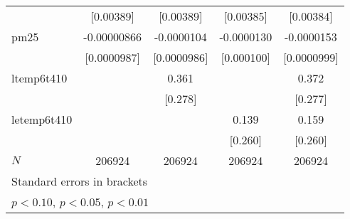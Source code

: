 {\begin{tabular}{l*{4}{c}}
            &   [0.00389]         &   [0.00389]         &   [0.00385]         &   [0.00384]         \\
[1em]
pm25        & -0.00000866         &  -0.0000104         &  -0.0000130         &  -0.0000153         \\
            & [0.0000987]         & [0.0000986]         &  [0.000100]         & [0.0000999]         \\
[1em]
ltemp6t410  &                     &       0.361         &                     &       0.372         \\
            &                     &     [0.278]         &                     &     [0.277]         \\
[1em]
letemp6t410 &                     &                     &       0.139         &       0.159         \\
            &                     &                     &     [0.260]         &     [0.260]         \\
\hline
\(N\)       &      206924         &      206924         &      206924         &      206924         \\
\hline\hline
\multicolumn{5}{l}{\footnotesize Standard errors in brackets}\\
\multicolumn{5}{l}{\footnotesize \sym{*} \(p<0.10\), \sym{**} \(p<0.05\), \sym{***} \(p<0.01\)}\\
\end{tabular}
}
